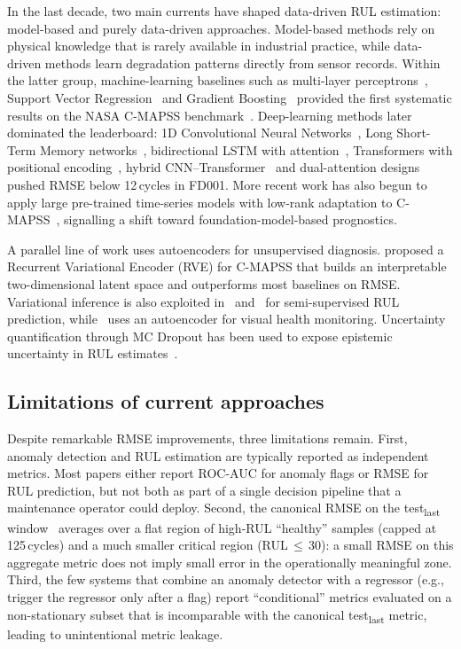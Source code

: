 \documentclass[5p,times,authoryear]{elsarticle}
\begin{document}
In the last decade, two main currents have shaped data-driven RUL estimation: model-based and purely data-driven approaches. Model-based methods rely on physical knowledge that is rarely available in industrial practice, while data-driven methods learn degradation patterns directly from sensor records. Within the latter group, machine-learning baselines such as multi-layer perceptrons~\citep{tian2012artificial}, Support Vector Regression~\citep{khelif2017direct} and Gradient Boosting~\citep{babu2016deep} provided the first systematic results on the NASA C-MAPSS benchmark~\citep{saxena2008damage}. Deep-learning methods later dominated the leaderboard: 1D Convolutional Neural Networks~\citep{li2018remaining}, Long Short-Term Memory networks~\citep{zheng2017long,asif2022deep}, bidirectional LSTM with attention~\citep{chen2020machine,mo2022remaining}, Transformers with positional encoding~\citep{zhu2021transformer}, hybrid CNN--Transformer~\citep{song2023cnntrf} and dual-attention designs~\citep{liu2023dual,wang2024hybrid} pushed RMSE below 12\,cycles in FD001. More recent work has also begun to apply large pre-trained time-series models with low-rank adaptation to C-MAPSS~\citep{chakravarty2025llm4ts}, signalling a shift toward foundation-model-based prognostics.

A parallel line of work uses autoencoders for unsupervised diagnosis. \citet{costa2022rve} proposed a Recurrent Variational Encoder (RVE) for C-MAPSS that builds an interpretable two-dimensional latent space and outperforms most baselines on RMSE. Variational inference is also exploited in~\citet{ellefsen2019remaining} and~\citet{xiang2021multicellular} for semi-supervised RUL prediction, while~\citet{martinez2019visually} uses an autoencoder for visual health monitoring. Uncertainty quantification through MC Dropout has been used to expose epistemic uncertainty in RUL estimates~\citep{xu2021machine}.

\subsection{Limitations of current approaches}\label{sec:limits}

Despite remarkable RMSE improvements, three limitations remain. First, anomaly detection and RUL estimation are typically reported as independent metrics. Most papers either report ROC-AUC for anomaly flags or RMSE for RUL prediction, but not both as part of a single decision pipeline that a maintenance operator could deploy. Second, the canonical RMSE on the test\textsubscript{last} window~\citep{li2018remaining} averages over a flat region of high-RUL ``healthy'' samples (capped at 125\,cycles) and a much smaller critical region (RUL\,$\le$\,30): a small RMSE on this aggregate metric does not imply small error in the operationally meaningful zone. Third, the few systems that combine an anomaly detector with a regressor (e.g., trigger the regressor only after a flag) report ``conditional'' metrics evaluated on a non-stationary subset that is incomparable with the canonical test\textsubscript{last} metric, leading to unintentional metric leakage.
\end{document}
